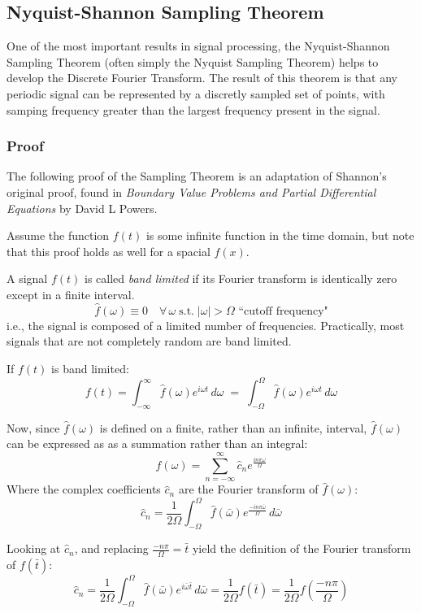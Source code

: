 \documentclass[12pt]{article}
\newcommand{\inftyint}{\int_{-\infty}^{\infty}}
\begin{document}
\subsection{Nyquist-Shannon Sampling Theorem}

One of the most important results in signal processing, the Nyquist-Shannon
Sampling Theorem (often simply the Nyquist Sampling Theorem) helps to develop
the Discrete Fourier Transform. The result of this theorem is that any periodic
signal can be represented by a discretly sampled set of points, with samping 
frequency greater than the largest frequency present in the signal. 

\subsubsection{Proof}

The following proof of the Sampling Theorem is an adaptation of Shannon's original
proof, found in \emph{Boundary Value Problems and Partial Differential 
Equations} by David L Powers.

Assume the function \(f(t)\) is some infinite function in the time domain, but note that
this proof holds as well for a spacial \(f(x)\).

A signal \(f(t)\) is called \emph{band limited} if its Fourier transform is
identically zero except in a finite interval.  \[\hat{f}(\omega) \equiv 0 \quad
\forall \, \omega \; \text{s.t.} \; |\omega| > \Omega \text{ ``cutoff
frequency"}\] i.e., the signal is composed of a limited number of frequencies.
Practically, most signals that are not completely random are band limited.

If \(f(t)\) is band limited: \begin{equation} \label{eq:nft} f(t) = \inftyint
    \hat{f}(\omega)e^{i\omega t} \,d\omega \; = \; \int_{-\Omega}^{\Omega}
    \hat{f}(\omega)e^{i\omega t} \,d\omega \end{equation}

Now, since \( \hat{f}(\omega) \) is defined on a finite, rather than an
infinite, interval, \( \hat{f}(\omega) \) can be expressed as as a summation
rather than an integral: \[\hat{f}(\omega) = \sum_{n = -\infty}^{\infty}
\hat{c}_{n}e^{\frac{i n \pi \omega}{\Omega}} \] Where the complex coefficients
\( \hat{c}_n\) are the Fourier transform of \( \hat{f}(\omega) \): \[\hat{ c}_n
= \frac{1}{2\Omega} \int_{-\Omega}^{\Omega} \hat{f}(\bar{\omega})e^{\frac{-i n
\pi \bar{ \omega}}{\Omega}}\,d\bar{\omega}\]

Looking at \(\hat{c}_n\), and replacing \( \frac{-n\pi}{\Omega} = \bar{t}\)
yield the definition of the Fourier transform of \( f(\bar{t})\): \[ \hat{c}_n
= \frac{1}{2\Omega} \int_{-\Omega}^{\Omega}
\hat{f}(\bar{\omega})e^{i\bar{\omega}\bar{t}}\,d\bar{\omega} =
\frac{1}{2\Omega} f(\bar{t}) = \frac{1}{2\Omega} f(\frac{-n\pi}{\Omega})\]
\end{document}
